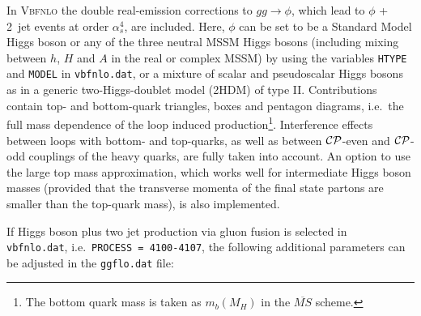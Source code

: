 \documentclass[english,12pt]{article}
\begin{document}
In \textsc{Vbfnlo} the double real-emission corrections to $gg\to \phi$,  which
lead to $\phi$ + 2~jet events at order $\alpha_s^{4}$, are
included\cite{Campanario:2010mi}. Here, $\phi$ can be set to be a Standard Model
Higgs boson or any of the three neutral MSSM Higgs bosons (including mixing
between $h$, $H$ and $A$ in the real or complex MSSM) by using the variables
{\tt HTYPE} and {\tt MODEL} in {\tt vbfnlo.dat}, or a mixture of scalar and
pseudoscalar Higgs bosons as in a generic two-Higgs-doublet model (2HDM) of type
II.  Contributions contain top- and bottom-quark triangles, boxes and pentagon
diagrams, i.e.\ the full mass dependence of the loop induced
production\footnote{The bottom quark mass is taken as $m_{b}(M_{H})$ in the $\overline{MS}$ scheme.}.
Interference effects between loops with bottom- and top-quarks, as well as
between ${\cal{CP}}$-even and ${\cal{CP}}$-odd couplings of the heavy quarks,
are fully taken into account. An option to use the large top mass approximation,
which works well for intermediate Higgs boson masses (provided that the
transverse momenta of the final state partons are smaller than the top-quark
mass), is also implemented.

If Higgs boson plus two jet production via gluon fusion is selected in {\tt
vbfnlo.dat}, i.e.\ {\tt PROCESS = 4100-4107}, the following additional
parameters can be adjusted in the {\tt ggflo.dat} file:
\end{document}
